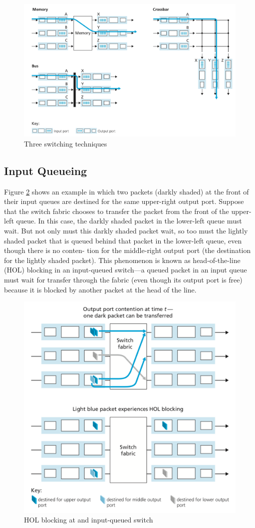 \documentclass[11pt]{article}
\begin{document}
\begin{figure}[h]
	\centering
	\includegraphics[width=0.8\linewidth]{images/switching.png}
	\caption{Three switching techniques}
	\label{fig:switching}
\end{figure}



\subsection{Input Queueing}

Figure \ref{fig:hol} shows an example in which two packets (darkly shaded) at the front of their input queues are destined for the same upper-right output port. Suppose that the switch fabric chooses to transfer the packet from the front of the upper-left queue. In this case, the darkly shaded packet in the lower-left queue must wait. But not only must this darkly shaded packet wait, so too must the lightly shaded packet that is queued behind that packet in the lower-left queue, even though there is no conten- tion for the middle-right output port (the destination for the lightly shaded packet). This phenomenon is known as head-of-the-line (HOL) blocking in an input-queued switch—a queued packet in an input queue must wait for transfer through the fabric (even though its output port is free) because it is blocked by another packet at the head of the line. 

\begin{figure}[h]
	\centering
	\includegraphics[width=0.8\linewidth]{images/hol.png}
	\caption{HOL blocking at and input-queued switch}
	\label{fig:hol}
\end{figure}
\end{document}
